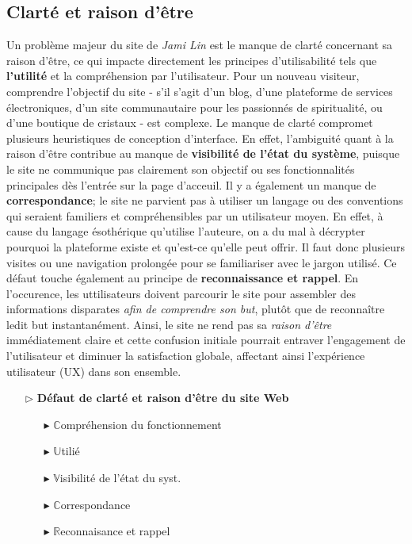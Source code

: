 \documentclass[9pt]{report}
\begin{document}
\begin{multicols*}{2}
  \subsection{Clarté et raison d'être} 
  Un problème majeur du site de \textit{Jami Lin} est le manque de clarté concernant sa 
  raison d'être, ce qui impacte directement les principes d'utilisabilité tels que 
  \textbf{l'utilité} et la compréhension par l'utilisateur. Pour un nouveau visiteur, 
  comprendre l'objectif du site - s'il s'agit d'un blog, d'une plateforme de 
  services électroniques, d'un site communautaire pour les passionnés de spiritualité,
  ou d'une boutique de cristaux - est complexe. Le manque de clarté 
  compromet plusieurs heuristiques 
  de conception d'interface. En effet, l'ambiguité quant à la raison d'être 
  contribue au manque de 
  \textbf{visibilité de l'état du système}, puisque le site ne communique pas 
  clairement son objectif ou ses fonctionnalités principales dès l'entrée sur 
  la page d'acceuil. 
  Il y a également un manque de \textbf{correspondance}; le site ne parvient pas 
  à utiliser un langage ou des conventions qui seraient familiers et compréhensibles 
  par un utilisateur moyen. En effet, à cause du langage ésothérique 
  qu'utilise l'auteure, on a du mal à décrypter pourquoi la plateforme existe 
  et qu'est-ce qu'elle peut offrir. Il faut donc plusieurs visites 
  ou une navigation prolongée pour se familiariser avec le jargon utilisé. Ce défaut 
  touche également au principe de \textbf{reconnaissance et rappel}. En l'occurence, 
  les uttilisateurs doivent parcourir le site pour assembler des informations 
  disparates \textit{afin de comprendre son but}, plutôt que de reconnaître
  ledit but instantanément. Ainsi, le  site ne rend pas sa \textit{raison d'être} immédiatement 
  claire et cette confusion initiale pourrait entraver l'engagement de 
  l'utilisateur et diminuer la satisfaction globale, affectant ainsi l'expérience 
  utilisateur (UX) dans son ensemble.
  
  \begin{itemize}
    \item [$\rhd$ ] \textbf{Défaut de clarté et raison d'être du site Web}  
      \begin{itemize}
        \item [$\blacktriangleright$ ] $\mathbb{C}$ompréhension du fonctionnement  
        \item [$\blacktriangleright$ ] $\mathbb{U}$tilié 
        \item [$\blacktriangleright$ ] $\mathbb{V}$isibilité de l'état du syst.
        \item [$\blacktriangleright$ ] $\mathbb{C}$orrespondance
        \item [$\blacktriangleright$ ] $\mathbb{R}$econnaisance et rappel
      \end{itemize}
  \end{itemize}


\end{multicols*}
\end{document}
